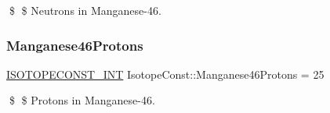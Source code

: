 \$ \$ Neutrons in Manganese-\/46. \mbox{\label{group___isotope_const-_manganese-_mn46_gacc1f227c960bc2ff72ec1f9a623266e4}} 
\subsubsection{\texorpdfstring{Manganese46\+Protons}{Manganese46Protons}}
{\footnotesize\ttfamily \mbox{\hyperlink{group___isotope_const-_macros_ga5f18360b3e99483a35c32d789e62621c}{I\+S\+O\+T\+O\+P\+E\+C\+O\+N\+S\+T\+\_\+\+I\+NT}} Isotope\+Const\+::\+Manganese46\+Protons = 25}

\$ \$ Protons in Manganese-\/46. 